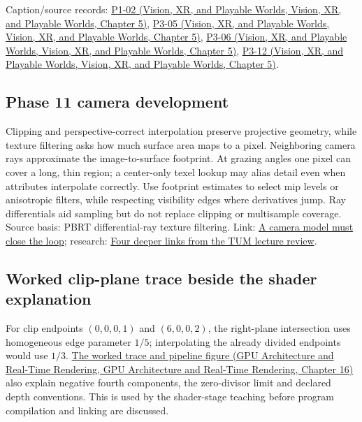 Caption/source records: \href{../07-Vision-XR-and-Playable-Worlds/main.pdf\#nameddest=04-visual-computing-ii-ch036-p1-02---module-1.2-course-intro-administrivia-part-2-graphics-visual-computing-2026}{P1-02 (Vision, XR, and Playable Worlds, Vision, XR, and Playable Worlds, Chapter 5)}, \href{../07-Vision-XR-and-Playable-Worlds/main.pdf\#nameddest=04-visual-computing-ii-ch036-p3-05---the-camera-transform}{P3-05 (Vision, XR, and Playable Worlds, Vision, XR, and Playable Worlds, Chapter 5)}, \href{../07-Vision-XR-and-Playable-Worlds/main.pdf\#nameddest=04-visual-computing-ii-ch036-p3-06---clipping}{P3-06 (Vision, XR, and Playable Worlds, Vision, XR, and Playable Worlds, Chapter 5)}, \href{../07-Vision-XR-and-Playable-Worlds/main.pdf\#nameddest=04-visual-computing-ii-ch036-p3-12---scan-conversion}{P3-12 (Vision, XR, and Playable Worlds, Vision, XR, and Playable Worlds, Chapter 5)}.

\subsection{Phase 11 camera development}\label{appendix-40426e4b2103-phase-11-camera-development}

Clipping and perspective-correct interpolation preserve projective geometry, while texture filtering asks how much surface area maps to a pixel. Neighboring camera rays approximate the image-to-surface footprint. At grazing angles one pixel can cover a long, thin region; a center-only texel lookup may alias detail even when attributes interpolate correctly. Use footprint estimates to select mip levels or anisotropic filters, while respecting visibility edges where derivatives jump. Ray differentials aid sampling but do not replace clipping or multisample coverage. Source basis: PBRT differential-ray texture filtering. Link: \hyperref[02-foundations-ii-ch037-a-camera-model-must-close-the-loop]{A camera model must close the loop}; research: \hyperref[02-foundations-ii-ch036-four-deeper-links-from-the-tum-lecture-review]{Four deeper links from the TUM lecture review}.

\subsection{Worked clip-plane trace beside the shader explanation}\label{appendix-40426e4b2103-worked-clip-plane-trace-beside-the-shader-explanation}

For clip endpoints \((0,0,0,1)\) and \((6,0,0,2)\), the right-plane intersection uses homogeneous edge parameter \(1/5\); interpolating the already divided endpoints would use \(1/3\). \href{../06-GPU-Architecture-and-Real-Time-Rendering/main.pdf\#nameddest=06-engine-ii-ch025-clip-coordinates-are-not-normalized-device-coordinates}{The worked trace and pipeline figure (GPU Architecture and Real-Time Rendering, GPU Architecture and Real-Time Rendering, Chapter 16)} also explain negative fourth components, the zero-divisor limit and declared depth conventions. This is used by the shader-stage teaching before program compilation and linking are discussed.

